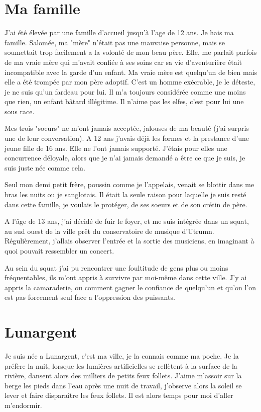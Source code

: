 \documentclass[10pt,a4paper,twoside,twocolumn,openany]{book}
\begin{document}
\section{Ma famille}

J'ai été élevée par une famille d'accueil jusqu'à l'age de 12 ans. Je hais ma famille.
Salomée, ma "mère" n'était pas une mauvaise personne, mais se soumettait trop
facilement a la volonté de mon beau père. Elle, me parlait parfois 
de ma vraie mère qui m'avait confiée à ses soins car sa vie d'aventurière était incompatible
avec la garde d'un enfant. Ma vraie mère est quelqu'un de bien mais elle a été trompée par mon
père adoptif. C'est un homme exécrable, je le déteste, je ne suis qu'un fardeau pour lui. Il 
m'a toujours considérée comme une moins que rien, un enfant bâtard illégitime. Il n'aime pas
les elfes, c'est pour lui une sous race.

Mes trois "soeurs" ne m'ont jamais acceptée, jalouses de ma beauté (j'ai surpris une
de leur conversation). A 12 ans j'avais déjà les formes et la prestance d'une jeune fille de 16
ans. Elle ne l'ont jamais supporté. J'étais pour elles une concurrence déloyale, alors que je n'ai
jamais demandé a être ce que je suis, je suis juste née comme cela.

Seul mon demi petit frère, poussin comme je l'appelais, venait se blottir dans me bras
les nuits ou je sanglotais. Il était la seule raison pour laquelle je suis resté dans cette famille,
je voulais le protéger, de ses soeurs et de son crétin de père.

A l'âge de 13 ans, j'ai décidé de fuir le foyer, et me suis intégrée dans un squat, au sud ouest de la ville
prêt du conservatoire de musique d'Utrumn.
Régulièrement, j'allais observer l'entrée et la sortie des musiciens, en imaginant à quoi pouvait ressembler
un concert. 

Au sein du squat j'ai pu rencontrer une foultitude de gens plus ou moins fréquentables, ils m'ont appris
à survivre par moi-même dans cette ville. J'y ai appris la camaraderie, ou comment gagner le confiance de quelqu'un
et qu'on l'on est pas forcement seul face a l'oppression des puissants.


\section{Lunargent}

Je suis née a Lunargent, c'est ma ville, je la connais comme ma poche. Je la préfère la nuit, lorsque
les lumières artificielles se reflètent à la surface de la rivière, dansent alors des milliers de petits feux follets. 
J'aime m'assoir sur la berge les pieds dans l'eau après une nuit de travail, j'observe alors la soleil
se lever et faire disparaître les feux follets. Il est alors temps pour moi d'aller m'endormir.
\end{document}

